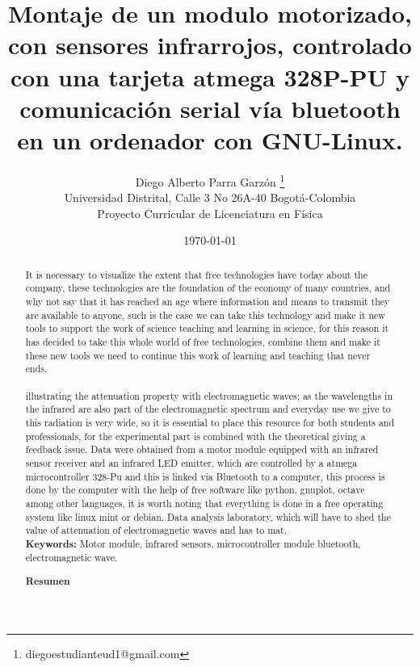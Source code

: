 \documentclass[12]{article}
\title{\bf{Montaje de un modulo motorizado, con sensores infrarrojos, controlado con una tarjeta atmega 328P-PU y comunicación serial vía bluetooth en un ordenador con GNU-Linux.}}
\author{Diego Alberto Parra Garzón \footnote{diegoestudianteud1@gmail.com} \\ Universidad Distrital, Calle 3 No 26A-40 Bogotá-Colombia \\    Proyecto Curricular de Licenciatura en Física }
\date{\today}
\def\tablename{Tabla}%
\begin{document}
\renewcommand{\tablename}{Tabla}
\maketitle
\vspace{-0.8cm}

\begin{abstract}
It is necessary to visualize the extent that free technologies have today about the company, these technologies are the foundation of the economy of many countries, and why not say that it has reached an age where information and means to transmit they are available to anyone, such is the case we can take this technology and make it new tools to support the work of science teaching and learning in science, for this reason it has decided to take this whole world of free technologies, combine them and make it these new tools we need to continue this work of learning and teaching that never ends.\\ \\
illustrating the attenuation property with electromagnetic waves; as the wavelengths in the infrared are also part of the electromagnetic spectrum and everyday use we give to this radiation is very wide, so it is essential to place this resource for both students and professionals, for the experimental part is combined with the theoretical giving a feedback issue. Data were obtained from a motor module equipped with an infrared sensor receiver and an infrared LED emitter, which are controlled by a atmega microcontroller 328-Pu and this is linked via Bluetooth to a computer, this process is done by the computer with the help of free software like python, gnuplot, octave among other languages, it is worth noting that everything is done in a free operating system like linux mint or debian. Data analysis laboratory, which will have to shed the value of attenuation of electromagnetic waves and has to mat.\\ 
{\bf{Keywords:}} Motor module, infrared sensors, microcontroller module bluetooth, electromagnetic wave.


\begin{center}
{\bf{Resumen}} 
\end{center}


\end{abstract}
\end{document}
